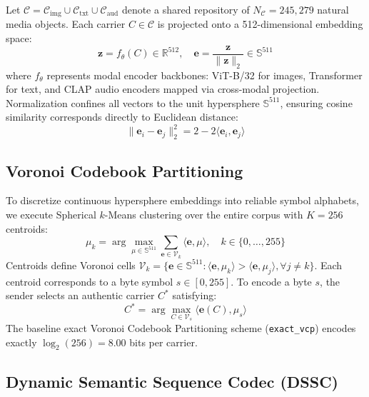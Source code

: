 \documentclass[11pt,journal,onecolumn]{IEEEtran}\linespread{1.3}
\begin{document}
Let $\mathcal{C} = \mathcal{C}_{\text{img}} \cup \mathcal{C}_{\text{txt}} \cup \mathcal{C}_{\text{aud}}$ denote a shared repository of $N_{\mathcal{C}} = 245,279$ natural media objects. Each carrier $C \in \mathcal{C}$ is projected onto a 512-dimensional embedding space:
\begin{equation}
\mathbf{z} = f_{\theta}(C) \in \mathbb{R}^{512}, \quad \mathbf{e} = \frac{\mathbf{z}}{\|\mathbf{z}\|_2} \in \mathbb{S}^{511}
\end{equation}
where $f_{\theta}$ represents modal encoder backbones: ViT-B/32 for images, Transformer for text, and CLAP audio encoders mapped via cross-modal projection. Normalization confines all vectors to the unit hypersphere $\mathbb{S}^{511}$, ensuring cosine similarity corresponds directly to Euclidean distance:
\begin{equation}
\|\mathbf{e}_i - \mathbf{e}_j\|_2^2 = 2 - 2\langle \mathbf{e}_i, \mathbf{e}_j \rangle
\end{equation}

\subsection{Voronoi Codebook Partitioning}

To discretize continuous hypersphere embeddings into reliable symbol alphabets, we execute Spherical $k$-Means clustering over the entire corpus with $K = 256$ centroids:
\begin{equation}
\mu_k = \arg\max_{\mu \in \mathbb{S}^{511}} \sum_{\mathbf{e} \in \mathcal{V}_k} \langle \mathbf{e}, \mu \rangle, \quad k \in \{0, \dots, 255\}
\end{equation}
Centroids define Voronoi cells $\mathcal{V}_k = \{\mathbf{e} \in \mathbb{S}^{511} : \langle \mathbf{e}, \mu_k \rangle > \langle \mathbf{e}, \mu_j \rangle, \forall j \neq k\}$. Each centroid corresponds to a byte symbol $s \in [0, 255]$. To encode a byte $s$, the sender selects an authentic carrier $C^*$ satisfying:
\begin{equation}
C^* = \arg\max_{C \in \mathcal{V}_s} \langle \mathbf{e}(C), \mu_s \rangle
\end{equation}
The baseline exact Voronoi Codebook Partitioning scheme (\texttt{exact\_vcp}) encodes exactly $\log_2(256) = 8.00$ bits per carrier.

\subsection{Dynamic Semantic Sequence Codec (DSSC)}
\end{document}
